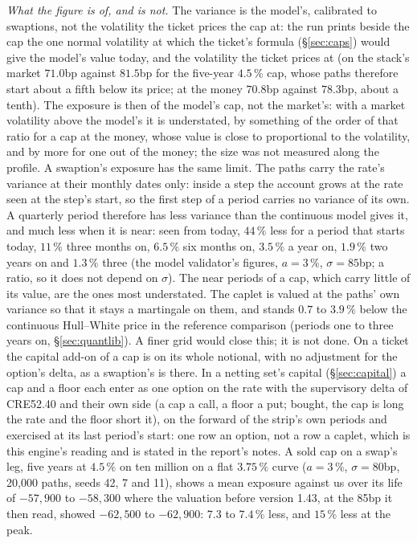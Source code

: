 \documentclass[11pt,a4paper]{article}
\begin{document}
\emph{What the figure is of, and is not.} The variance is the model's, calibrated to swaptions, not the volatility the ticket prices the cap at: the run prints beside the cap the one normal volatility at which the ticket's formula (\S\ref{sec:caps}) would give the model's value today, and the volatility the ticket prices at (on the stack's market $71.0$bp against $81.5$bp for the five-year $4.5\,\%$ cap, whose paths therefore start about a fifth below its price; at the money $70.8$bp against $78.3$bp, about a tenth). The exposure is then of the model's cap, not the market's: with a market volatility above the model's it is understated, by something of the order of that ratio for a cap at the money, whose value is close to proportional to the volatility, and by more for one out of the money; the size was not measured along the profile. A swaption's exposure has the same limit. The paths carry the rate's variance at their monthly dates only: inside a step the account grows at the rate seen at the step's start, so the first step of a period carries no variance of its own. A quarterly period therefore has less variance than the continuous model gives it, and much less when it is near: seen from today, $44\,\%$ less for a period that starts today, $11\,\%$ three months on, $6.5\,\%$ six months on, $3.5\,\%$ a year on, $1.9\,\%$ two years on and $1.3\,\%$ three (the model validator's figures, $a=3\,\%$, $\sigma=85$bp; a ratio, so it does not depend on $\sigma$). The near periods of a cap, which carry little of its value, are the ones most understated. The caplet is valued at the paths' own variance so that it stays a martingale on them, and stands $0.7$ to $3.9\,\%$ below the continuous Hull--White price in the reference comparison (periods one to three years on, \S\ref{sec:quantlib}). A finer grid would close this; it is not done. On a ticket the capital add-on of a cap is on its whole notional, with no adjustment for the option's delta, as a swaption's is there. In a netting set's capital (\S\ref{sec:capital}) a cap and a floor each enter as one option on the rate with the supervisory delta of CRE52.40 and their own side (a cap a call, a floor a put; bought, the cap is long the rate and the floor short it), on the forward of the strip's own periods and exercised at its last period's start: one row an option, not a row a caplet, which is this engine's reading and is stated in the report's notes. A sold cap on a swap's leg, five years at $4.5\,\%$ on ten million on a flat $3.75\,\%$ curve ($a=3\,\%$, $\sigma=80$bp, 20{,}000 paths, seeds 42, 7 and 11), shows a mean exposure against us over its life of $-57{,}900$ to $-58{,}300$ where the valuation before version 1.43, at the 85bp it then read, showed $-62{,}500$ to $-62{,}900$: $7.3$ to $7.4\,\%$ less, and $15\,\%$ less at the peak.
\end{document}
